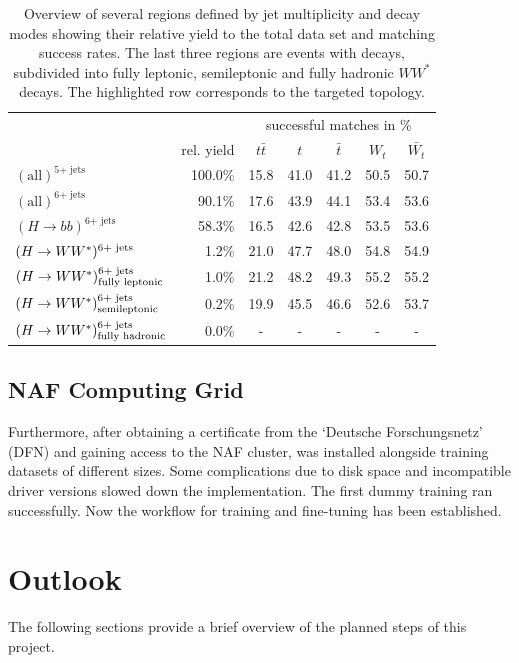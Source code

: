 \documentclass[bachelor,ngerman,english]{GAUBM}
\begin{document}
\begin{table}
    \centering
    \caption{Overview of several regions defined by jet multiplicity and decay modes showing their relative yield to the total data set and matching success rates. The last three regions are events with \HWW decays, subdivided into fully leptonic, semileptonic and fully hadronic $WW^*$ decays. The highlighted row corresponds to the targeted topology.}
    \begin{tabular}{l|r|c|c|c|c|c|}
        &&\multicolumn{5}{c|}{successful matches in \%}\\
        & rel. yield & $t\bar{t}$ & $t$ & $\bar{t}$ & $W_t$ & $\bar{W_t}$\\
        \hline
        $(\text{all})^{\text{5+ jets}}$  & 100.0\% & 15.8 & 41.0 & 41.2 & 50.5 & 50.7\\
        $(\text{all})^{\text{6+ jets}}$  & 90.1\% & 17.6 & 43.9 & 44.1 & 53.4 & 53.6\\
        $(H\rightarrow bb)^{\text{6+ jets}}$ & 58.3\% & 16.5 & 42.6 & 42.8 & 53.5 & 53.6\\
        $(\mbox{$H\rightarrow WW^*$})^{\text{6+ jets}}$ & 1.2\% & 21.0 & 47.7 & 48.0 & 54.8 & 54.9\\
        \hline
        $(\mbox{$H\rightarrow WW^*$})_{\text{fully leptonic}}^{\text{6+ jets}}$ & 1.0\% & 21.2 & 48.2 & 49.3 & 55.2 & 55.2\\
        \rowcolor{gray!40}
        $(\mbox{$H\rightarrow WW^*$})_{\text{semileptonic}}^{\text{6+ jets}}$ & 0.2\% & 19.9 & 45.5 & 46.6 & 52.6 & 53.7\\
        $(\mbox{$H\rightarrow WW^*$})_{\text{fully hadronic}}^{\text{6+ jets}}$ & 0.0\% & - & - & - & - & -\\
    \end{tabular}
    \label{tab:higgs_decay}
\end{table}

\section{NAF Computing Grid}
\label{sec:status:installing_on_naf}
Furthermore, after obtaining a certificate from the `Deutsche Forschungsnetz' (DFN) and gaining access to the NAF cluster, \spanet was installed alongside training datasets of different sizes. Some complications due to disk space and incompatible driver versions slowed down the implementation. The first dummy training ran successfully. Now the workflow for training and fine-tuning \spanet has been established. 


\chapter{Outlook}
\label{ch:outlook}
The following sections provide a brief overview of the planned steps of this project.  
\end{document}
